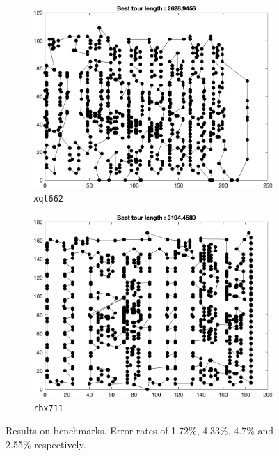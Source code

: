 \begin{figure}[H]
	\centering
	\begin{subfigure}[b]{0.45\textwidth}
		\centering
		\includegraphics[width=\textwidth]{benchmarks/xql662.png}
		\caption{\texttt{xql662}}
    	\end{subfigure}
	\begin{subfigure}[b]{0.45\textwidth}
		\centering
		\includegraphics[width=\textwidth]{benchmarks/rbx711.png}
		\caption{\texttt{rbx711}}
    	\end{subfigure}
\caption*{Results on benchmarks. Error rates of 1.72\%, 4.33\%, 4.7\% and 2.55\% respectively.}
\label{fig:bench1}
\end{figure}

